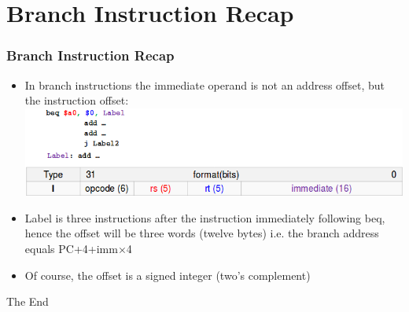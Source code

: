\documentclass{beamer}
\begin{document}
\section{Branch Instruction Recap}
\begin{frame}
\frametitle{Branch Instruction Recap}
\begin{itemize}
\item In branch instructions the immediate operand is not an address offset, but the instruction offset:
\includegraphics[scale=0.4]{brec.png}
\item {\color{purple}Label} is three instructions after the instruction immediately following beq, hence the offset will be three words (twelve bytes) i.e. the branch address equals PC+4+imm$\times$4
\item Of course, the offset is a signed integer (two's complement)
\end{itemize}
\end{frame}


\begin{frame} 
\Huge{\centerline{The End}}
\end{frame}
\end{document}
